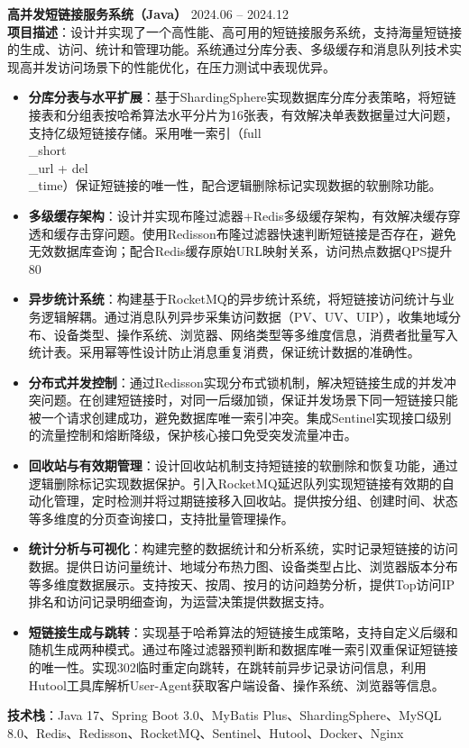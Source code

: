 \noindent
\textbf{高并发短链接服务系统（Java）} \hfill 2024.06 – 2024.12 \\
\textbf{项目描述}：设计并实现了一个高性能、高可用的短链接服务系统，支持海量短链接的生成、访问、统计和管理功能。系统通过分库分表、多级缓存和消息队列技术实现高并发访问场景下的性能优化，在压力测试中表现优异。
\begin{itemize}
    \item \textbf{分库分表与水平扩展}：基于ShardingSphere实现数据库分库分表策略，将短链接表和分组表按哈希算法水平分片为16张表，有效解决单表数据量过大问题，支持亿级短链接存储。采用唯一索引（full\\_short\\_url + del\\_time）保证短链接的唯一性，配合逻辑删除标记实现数据的软删除功能。
    \item \textbf{多级缓存架构}：设计并实现布隆过滤器+Redis多级缓存架构，有效解决缓存穿透和缓存击穿问题。使用Redisson布隆过滤器快速判断短链接是否存在，避免无效数据库查询；配合Redis缓存原始URL映射关系，访问热点数据QPS提升80\\%
    \item \textbf{异步统计系统}：构建基于RocketMQ的异步统计系统，将短链接访问统计与业务逻辑解耦。通过消息队列异步采集访问数据（PV、UV、UIP），收集地域分布、设备类型、操作系统、浏览器、网络类型等多维度信息，消费者批量写入统计表。采用幂等性设计防止消息重复消费，保证统计数据的准确性。
    \item \textbf{分布式并发控制}：通过Redisson实现分布式锁机制，解决短链接生成的并发冲突问题。在创建短链接时，对同一后缀加锁，保证并发场景下同一短链接只能被一个请求创建成功，避免数据库唯一索引冲突。集成Sentinel实现接口级别的流量控制和熔断降级，保护核心接口免受突发流量冲击。
    \item \textbf{回收站与有效期管理}：设计回收站机制支持短链接的软删除和恢复功能，通过逻辑删除标记实现数据保护。引入RocketMQ延迟队列实现短链接有效期的自动化管理，定时检测并将过期链接移入回收站。提供按分组、创建时间、状态等多维度的分页查询接口，支持批量管理操作。
    \item \textbf{统计分析与可视化}：构建完整的数据统计和分析系统，实时记录短链接的访问数据。提供日访问量统计、地域分布热力图、设备类型占比、浏览器版本分布等多维度数据展示。支持按天、按周、按月的访问趋势分析，提供Top访问IP排名和访问记录明细查询，为运营决策提供数据支持。
    \item \textbf{短链接生成与跳转}：实现基于哈希算法的短链接生成策略，支持自定义后缀和随机生成两种模式。通过布隆过滤器预判断和数据库唯一索引双重保证短链接的唯一性。实现302临时重定向跳转，在跳转前异步记录访问信息，利用Hutool工具库解析User-Agent获取客户端设备、操作系统、浏览器等信息。
\end{itemize}
\textbf{技术栈}：Java 17、Spring Boot 3.0、MyBatis Plus、ShardingSphere、MySQL 8.0、Redis、Redisson、RocketMQ、Sentinel、Hutool、Docker、Nginx
\vspace{0.2cm}
